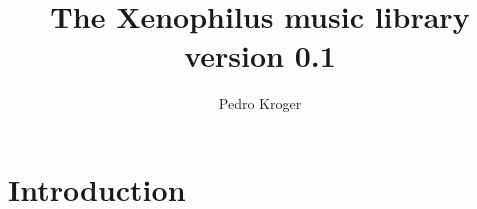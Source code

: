 \documentclass[11pt]{article}
\title{The Xenophilus music library \\ version 0.1}
\author{Pedro Kroger}
\begin{document}
\maketitle
\tableofcontents
\newpage

\section{Introduction}
\label{sec:introduction}
\end{document}
